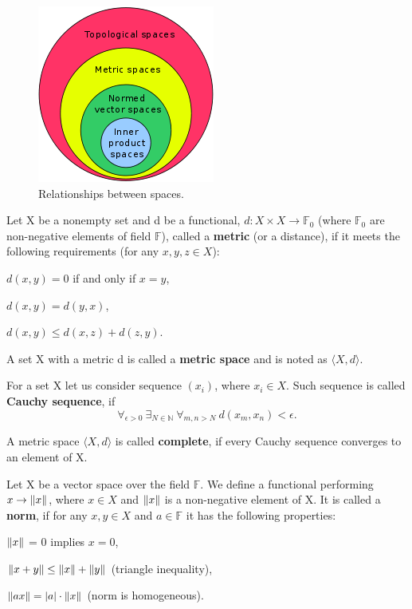 \begin{figure}[ht]
\centering
\includegraphics{spaces}
\caption{Relationships between spaces.}
\end{figure}

\begin{definition} \label{metric_space}
Let X be a nonempty set and d be a functional, $d: X \times X \rightarrow \mathbb{F}_{0}$ (where $\mathbb{F}_0$ are non-negative elements of field $\mathbb{F}$), called a \textbf{metric} (or a distance), if it meets the following requirements (for any $x,y,z \in X$):
\begin{legal}
    \item $d(x, y) = 0$ if and only if $x = y$,
    \item $d(x, y) = d(y, x)$,
    \item $d(x, y) \leq d(x, z) + d(z, y)$.
\end{legal}

A set X with a metric d is called a \textbf{metric space} and is noted as $\langle X, d \rangle $.
\end{definition}

\begin{definition}
For a set X let us consider sequence $(x_i)$, where $x_i \in X$. Such sequence is called \textbf{Cauchy sequence}, if
\[ \forall_{\epsilon > 0} \ \exists_{N \in \mathbb{N}} \ \forall_{m,n > N} \ d(x_m, x_n) < \epsilon. \]
\end{definition}

\begin{definition}
A metric space $\langle X, d \rangle$ is called \textbf{complete}, if every Cauchy sequence converges to an element of X.
\end{definition}

\begin{definition}
Let X be a vector space over the field $\mathbb{F}$. We define a functional performing $ x \rightarrow \left\lVert x\right\rVert$, where $ x \in X$ and $\left\lVert x\right\rVert$ is a non-negative element of X. It is called a \textbf{norm}, if for any $x,y \in X$ and $a \in \mathbb{F}$ it has the following properties:
\begin{legal}
	\item $\left\lVert x\right\rVert$ = 0 implies $x = 0$,
	\item $ \left\lVert x + y\right\rVert \leq \left\lVert x\right\rVert + \left\lVert y\right\rVert$ (triangle inequality),
	\item $\left\lVert ax\right\rVert = |a| \cdot \left\lVert x\right\rVert$ (norm is homogeneous).
\end{legal}
\end{definition}

